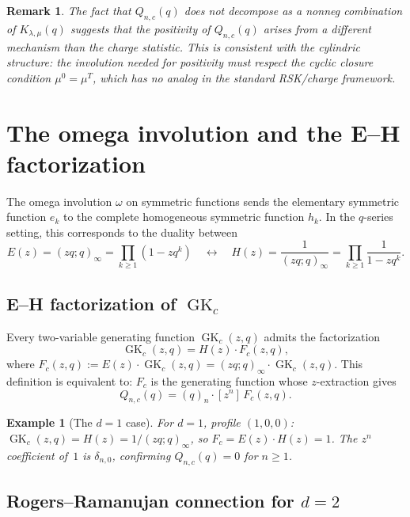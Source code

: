 \documentclass[11pt]{article}
\newtheorem{remark}[theorem]{Remark}
\newtheorem{example}[theorem]{Example}
\newcommand{\GK}{\operatorname{GK}}
\newcommand{\qpoch}[2]{(#1;#2)_\infty}
\begin{document}
\begin{remark}
The fact that $Q_{n,c}(q)$ does not decompose as a nonneg combination of
$K_{\lambda,\mu}(q)$ suggests that the positivity of $Q_{n,c}(q)$ arises from a
different mechanism than the charge statistic. This is consistent with the
cylindric structure: the involution needed for positivity must respect the
cyclic closure condition $\mu^0 = \mu^T$, which has no analog in the standard
RSK/charge framework.
\end{remark}


\section{The omega involution and the E--H factorization}
\label{sec:omega-involution}

The omega involution $\omega$ on symmetric functions sends the elementary
symmetric function $e_k$ to the complete homogeneous symmetric function $h_k$.
In the $q$-series setting, this corresponds to the duality between
\[
  E(z) = \qpoch{zq}{q} = \prod_{k \geq 1}(1 - zq^k)
  \quad \longleftrightarrow \quad
  H(z) = \frac{1}{\qpoch{zq}{q}} = \prod_{k \geq 1}\frac{1}{1 - zq^k}.
\]

\subsection{E--H factorization of $\GK_c$}

Every two-variable generating function $\GK_c(z,q)$ admits the factorization
\begin{equation}
  \GK_c(z,q) = H(z) \cdot F_c(z,q),
  \label{eq:EH-factor}
\end{equation}
where $F_c(z,q) := E(z) \cdot \GK_c(z,q) = \qpoch{zq}{q} \cdot \GK_c(z,q)$.
This definition is equivalent to: $F_c$ is the generating function whose
$z$-extraction gives
\[
  Q_{n,c}(q) = (q)_n \cdot [z^n]\, F_c(z,q).
\]

\begin{example}[The $d = 1$ case]
For $d = 1$, profile $(1,0,0)$: $\GK_c(z,q) = H(z) = 1/(zq;q)_\infty$,
so $F_c = E(z) \cdot H(z) = 1$. The $z^n$ coefficient of~$1$ is $\delta_{n,0}$,
confirming $Q_{n,c}(q) = 0$ for $n \geq 1$.
\end{example}

\subsection{Rogers--Ramanujan connection for $d = 2$}
\end{document}

